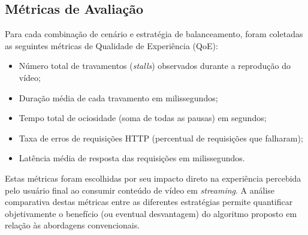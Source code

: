 \subsection{Métricas de Avaliação}

Para cada combinação de cenário e estratégia de balanceamento, foram coletadas as seguintes métricas de Qualidade de Experiência (QoE):

\begin{itemize}
    \item Número total de travamentos (\textit{stalls}) observados durante a reprodução do vídeo;
    \item Duração média de cada travamento em milissegundos;
    \item Tempo total de ociosidade (soma de todas as pausas) em segundos;
    \item Taxa de erros de requisições HTTP (percentual de requisições que falharam);
    \item Latência média de resposta das requisições em milissegundos.
\end{itemize}

Estas métricas foram escolhidas por seu impacto direto na experiência percebida pelo usuário final ao consumir conteúdo de vídeo em \textit{streaming}. A análise comparativa destas métricas entre as diferentes estratégias permite quantificar objetivamente o benefício (ou eventual desvantagem) do algoritmo proposto em relação às abordagens convencionais.

